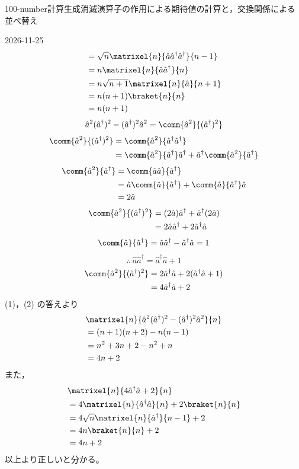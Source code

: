 \documentclass[uplatex,dvipdfmx,a4paper,11pt]{jsarticle}
\begin{document}
\begin{mondai}{100-number}{計算}{生成消滅演算子の作用による期待値の計算と，交換関係による並べ替え}
\begin{kotaeutsushi}{2026-11-25}
\begin{align*}
&=\sqrt{n}\matrixel{n}{\hat{a}\hat{a}^{\dagger}\hat{a}^{\dagger}}{n-1}\\
&=n\matrixel{n}{\hat{a}\hat{a}^{\dagger}}{n}\\
&=n\sqrt{n+1}\matrixel{n}{\hat{a}}{n+1}\\
&=n(n+1)\braket{n}{n}\\
&=n(n+1)
\end{align*}
\[ \hat{a}^{2}(\hat{a}^{\dagger})^{2}-(\hat{a}^{\dagger})^{2}\hat{a}^{2}=\comm{\hat{a}^{2}}{(\hat{a}^{\dagger})^{2}} \]
\begin{align*}
\comm{\hat{a}^{2}}{(\hat{a}^{\dagger})^{2}}&=\comm{\hat{a}^{2}}{\hat{a}^{\dagger}\hat{a}^{\dagger}}\\
&=\comm{\hat{a}^{2}}{\hat{a}^{\dagger}}\hat{a}^{\dagger}+\hat{a}^{\dagger}\comm{\hat{a}^{2}}{\hat{a}^{\dagger}}
\end{align*}
\begin{align*}
\comm{\hat{a}^{2}}{\hat{a}^{\dagger}}&=\comm{\hat{a}\hat{a}}{\hat{a}^{\dagger}}\\
&=\hat{a}\comm{\hat{a}}{\hat{a}^{\dagger}}+\comm{\hat{a}}{\hat{a}^{\dagger}}\hat{a}\\
&=2\hat{a}
\end{align*}
\begin{align*}
\comm{\hat{a}^{2}}{(\hat{a}^{\dagger})^{2}}&=(2\hat{a})\hat{a}^{\dagger}+\hat{a}^{\dagger}(2\hat{a})\\
&=2\hat{a}\hat{a}^{\dagger}+2\hat{a}^{\dagger}\hat{a}
\end{align*}
\[ \comm{\hat{a}}{\hat{a}^{\dagger}}=\hat{a}\hat{a}^{\dagger}-\hat{a}^{\dagger}\hat{a}=1 \]
\[ \therefore\ \hat{a}\hat{a}^{\dagger}=\hat{a}^{\dagger}\hat{a}+1 \]
\begin{align*}
\comm{\hat{a}^{2}}{(\hat{a}^{\dagger})^{2}}&=2\hat{a}^{\dagger}\hat{a}+2(\hat{a}^{\dagger}\hat{a}+1)\\
&=4\hat{a}^{\dagger}\hat{a}+2
\end{align*}
(1)，(2) の答えより
\begin{align*}
&\matrixel{n}{\hat{a}^{2}(\hat{a}^{\dagger})^{2}-(\hat{a}^{\dagger})^{2}\hat{a}^{2}}{n}\\
&=(n+1)(n+2)-n(n-1)\\
&=n^{2}+3n+2-n^{2}+n\\
&=4n+2
\end{align*}
また，
\begin{align*}
&\matrixel{n}{4\hat{a}^{\dagger}\hat{a}+2}{n}\\
&=4\matrixel{n}{\hat{a}^{\dagger}\hat{a}}{n}+2\braket{n}{n}\\
&=4\sqrt{n}\matrixel{n}{\hat{a}^{\dagger}}{n-1}+2\\
&=4n\braket{n}{n}+2\\
&=4n+2
\end{align*}
以上より正しいと分かる。
\end{kotaeutsushi}
\end{mondai}
\end{document}
